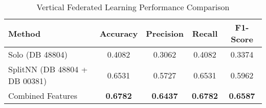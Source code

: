 \begin{table}[ht]
  \centering
  \caption{Vertical Federated Learning Performance Comparison}
  \label{tab:vertical_fl_comparison}
  \begin{tabular}{lcccc}
  \toprule
  \textbf{Method} & \textbf{Accuracy} & \textbf{Precision} & \textbf{Recall} & \textbf{F1-Score} \\
  \midrule
  Solo (DB 48804) & 0.4082 & 0.3062 & 0.4082 & 0.3374 \\
  \midrule
  SplitNN (DB 48804 + DB 00381) & 0.6531 & 0.5727 & 0.6531 & 0.5962 \\
  \midrule
  Combined Features & \textbf{0.6782} & \textbf{0.6437} & \textbf{0.6782} & \textbf{0.6587} \\
  \bottomrule
  \end{tabular}
\end{table}